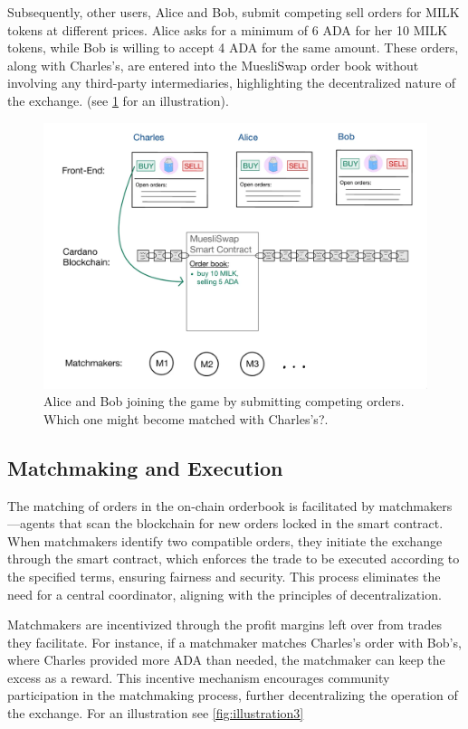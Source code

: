 \documentclass[11pt]{article}
\begin{document}
Subsequently, other users, Alice and Bob, submit competing sell orders for MILK tokens at different prices. Alice asks for a minimum of 6 ADA for her 10 MILK tokens, while Bob is willing to accept 4 ADA for the same amount. These orders, along with Charles's, are entered into the MuesliSwap order book without involving any third-party intermediaries, highlighting the decentralized nature of the exchange. (see \ref{fig:illustration2} for an illustration).

\begin{figure}[H]
    \centering
    \includegraphics[scale=0.18]{illustration1.png}
    \caption{Alice and Bob joining the game by submitting competing orders. Which one might become matched with Charles’s?.}
    \label{fig:illustration2}
\end{figure}



\subsection{Matchmaking and Execution}
The matching of orders in the on-chain orderbook is facilitated by matchmakers—agents that scan the blockchain for new orders locked in the smart contract. When matchmakers identify two compatible orders, they initiate the exchange through the smart contract, which enforces the trade to be executed according to the specified terms, ensuring fairness and security. This process eliminates the need for a central coordinator, aligning with the principles of decentralization.

Matchmakers are incentivized through the profit margins left over from trades they facilitate. For instance, if a matchmaker matches Charles's order with Bob's, where Charles provided more ADA than needed, the matchmaker can keep the excess as a reward. This incentive mechanism encourages community participation in the matchmaking process, further decentralizing the operation of the exchange. For an illustration see \ref{fig:illustration3}
\end{document}
